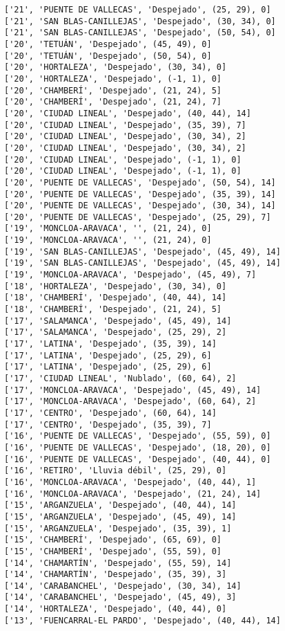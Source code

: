 \documentclass[11pt]{article}
\begin{document}
\begin{Verbatim}[commandchars=\\\{\}]
['21', 'PUENTE DE VALLECAS', 'Despejado', (25, 29), 0]
['21', 'SAN BLAS-CANILLEJAS', 'Despejado', (30, 34), 0]
['21', 'SAN BLAS-CANILLEJAS', 'Despejado', (50, 54), 0]
['20', 'TETUÁN', 'Despejado', (45, 49), 0]
['20', 'TETUÁN', 'Despejado', (50, 54), 0]
['20', 'HORTALEZA', 'Despejado', (30, 34), 0]
['20', 'HORTALEZA', 'Despejado', (-1, 1), 0]
['20', 'CHAMBERÍ', 'Despejado', (21, 24), 5]
['20', 'CHAMBERÍ', 'Despejado', (21, 24), 7]
['20', 'CIUDAD LINEAL', 'Despejado', (40, 44), 14]
['20', 'CIUDAD LINEAL', 'Despejado', (35, 39), 7]
['20', 'CIUDAD LINEAL', 'Despejado', (30, 34), 2]
['20', 'CIUDAD LINEAL', 'Despejado', (30, 34), 2]
['20', 'CIUDAD LINEAL', 'Despejado', (-1, 1), 0]
['20', 'CIUDAD LINEAL', 'Despejado', (-1, 1), 0]
['20', 'PUENTE DE VALLECAS', 'Despejado', (50, 54), 14]
['20', 'PUENTE DE VALLECAS', 'Despejado', (35, 39), 14]
['20', 'PUENTE DE VALLECAS', 'Despejado', (30, 34), 14]
['20', 'PUENTE DE VALLECAS', 'Despejado', (25, 29), 7]
['19', 'MONCLOA-ARAVACA', '', (21, 24), 0]
['19', 'MONCLOA-ARAVACA', '', (21, 24), 0]
['19', 'SAN BLAS-CANILLEJAS', 'Despejado', (45, 49), 14]
['19', 'SAN BLAS-CANILLEJAS', 'Despejado', (45, 49), 14]
['19', 'MONCLOA-ARAVACA', 'Despejado', (45, 49), 7]
['18', 'HORTALEZA', 'Despejado', (30, 34), 0]
['18', 'CHAMBERÍ', 'Despejado', (40, 44), 14]
['18', 'CHAMBERÍ', 'Despejado', (21, 24), 5]
['17', 'SALAMANCA', 'Despejado', (45, 49), 14]
['17', 'SALAMANCA', 'Despejado', (25, 29), 2]
['17', 'LATINA', 'Despejado', (35, 39), 14]
['17', 'LATINA', 'Despejado', (25, 29), 6]
['17', 'LATINA', 'Despejado', (25, 29), 6]
['17', 'CIUDAD LINEAL', 'Nublado', (60, 64), 2]
['17', 'MONCLOA-ARAVACA', 'Despejado', (45, 49), 14]
['17', 'MONCLOA-ARAVACA', 'Despejado', (60, 64), 2]
['17', 'CENTRO', 'Despejado', (60, 64), 14]
['17', 'CENTRO', 'Despejado', (35, 39), 7]
['16', 'PUENTE DE VALLECAS', 'Despejado', (55, 59), 0]
['16', 'PUENTE DE VALLECAS', 'Despejado', (18, 20), 0]
['16', 'PUENTE DE VALLECAS', 'Despejado', (40, 44), 0]
['16', 'RETIRO', 'Lluvia débil', (25, 29), 0]
['16', 'MONCLOA-ARAVACA', 'Despejado', (40, 44), 1]
['16', 'MONCLOA-ARAVACA', 'Despejado', (21, 24), 14]
['15', 'ARGANZUELA', 'Despejado', (40, 44), 14]
['15', 'ARGANZUELA', 'Despejado', (45, 49), 14]
['15', 'ARGANZUELA', 'Despejado', (35, 39), 1]
['15', 'CHAMBERÍ', 'Despejado', (65, 69), 0]
['15', 'CHAMBERÍ', 'Despejado', (55, 59), 0]
['14', 'CHAMARTÍN', 'Despejado', (55, 59), 14]
['14', 'CHAMARTÍN', 'Despejado', (35, 39), 3]
['14', 'CARABANCHEL', 'Despejado', (30, 34), 14]
['14', 'CARABANCHEL', 'Despejado', (45, 49), 3]
['14', 'HORTALEZA', 'Despejado', (40, 44), 0]
['13', 'FUENCARRAL-EL PARDO', 'Despejado', (40, 44), 14]

\end{Verbatim}
\end{document}
